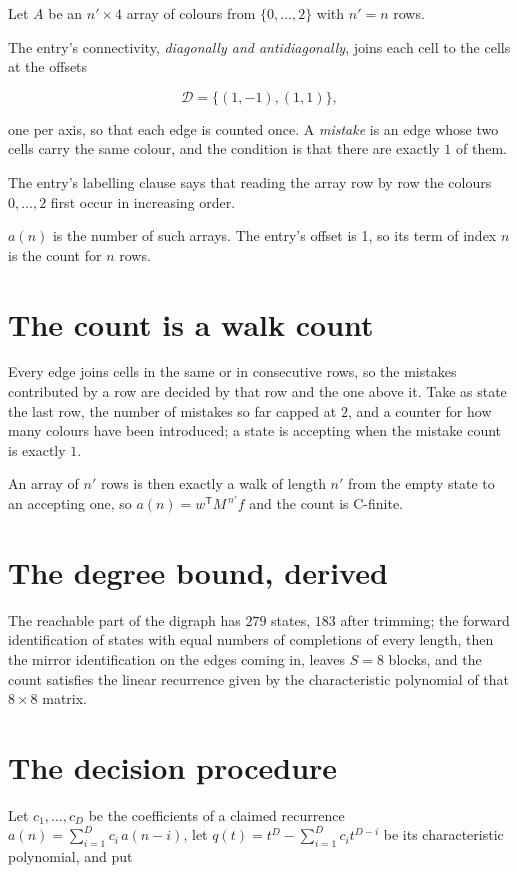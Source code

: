 \documentclass[11pt]{article}
\theoremstyle{definition}
\begin{document}
Let $A$ be an $n' \times 4$ array of colours from $\{0,\dots,2\}$ with $n' = n$ rows.

The entry's connectivity, {\itshape diagonally and antidiagonally}, joins each cell to the cells at the offsets

\[\mathcal{D} = \{(1,-1), (1,1)\},\]

one per axis, so that each edge is counted once. A {\itshape mistake} is an edge whose two cells carry the same colour, and the condition is that there are exactly $1$ of them.

The entry's labelling clause says that reading the array row by row the colours $0,\dots,2$ first occur in increasing order.

$a(n)$ is the number of such arrays. The entry's offset is 1, so its term of index $n$ is the count for $n$ rows.

\section{The count is a walk count}

Every edge joins cells in the same or in consecutive rows, so the mistakes contributed by a row are decided by that row and the one above it. Take as state the last row, the number of mistakes so far capped at $2$, and a counter for how many colours have been introduced; a state is accepting when the mistake count is exactly $1$.

An array of $n'$ rows is then exactly a walk of length $n'$ from the empty state to an accepting one, so $a(n) = w^{\mathsf T}M^{\,n'}f$ and the count is C-finite.

\section{The degree bound, derived}

The reachable part of the digraph has $279$ states, $183$ after trimming; the forward identification of states with equal numbers of completions of every length, then the mirror identification on the edges coming in, leaves $S = 8$ blocks, and the count satisfies the linear recurrence given by the characteristic polynomial of that $8\times8$ matrix.

\section{The decision procedure}

Let $c_1,\dots,c_D$ be the coefficients of a claimed recurrence $a(n) = \sum_{i=1}^{D} c_i\,a(n-i)$, let $q(t) = t^{D} - \sum_{i=1}^{D} c_i t^{D-i}$ be its characteristic polynomial, and put
\end{document}

